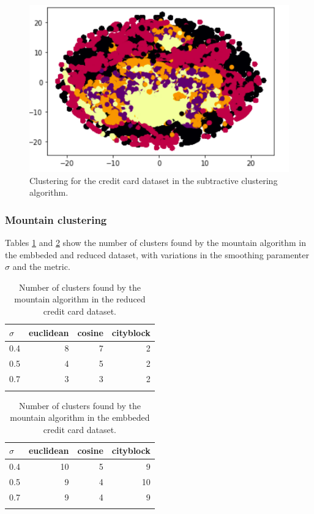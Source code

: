 \documentclass[conference]{IEEEtran}
\begin{document}
    \begin{figure}[ht!]
        \centering
        \includegraphics[scale = 0.4]{figures/credit/credit_s.png}
        \caption{Clustering for the credit card dataset in the subtractive clustering algorithm.}
        \label{fig:credit_s}
    \end{figure}
\subsubsection{Mountain clustering} Tables \ref{tab:c2_n_m} and \ref{tab:ce_n_m} show the number of clusters found by the mountain algorithm in the embbeded and reduced dataset, with variations in the smoothing paramenter $\sigma$ and the metric.

\begin{table}[ht!]
    \centering
   \begin{tabular}{lrrr}
    \toprule
    $\sigma$ &  euclidean &  cosine &  cityblock \\
    \midrule
    0.4 &          8 &       7 &          2 \\
    0.5 &          4 &       5 &          2 \\
    0.7 &          3 &       3 &          2 \\
    \bottomrule \\
    \end{tabular}
    \caption{Number of clusters found by the mountain algorithm in the reduced credit card dataset.}
    \label{tab:c2_n_m}
\end{table}

\begin{table}[ht!]
    \centering
    \begin{tabular}{lrrr}
    \toprule
    $\sigma$ &  euclidean &  cosine &  cityblock \\
    \midrule
    0.4 &         10 &       5 &          9 \\
    0.5 &          9 &       4 &         10 \\
    0.7 &          9 &       4 &          9 \\
    \bottomrule \\
    \end{tabular}
    \caption{Number of clusters found by the mountain algorithm in the embbeded credit card dataset.}
    \label{tab:ce_n_m}
\end{table}
\end{document}

